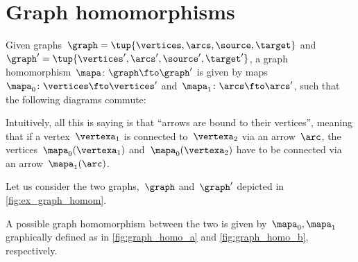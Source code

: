 
\section{Graph homomorphisms}
\begin{definition}
    \label{def:graph_homom}
    Given graphs~$\graph=\tup{\vertices,\arcs,\source,\target}$ and~$\graph'=\tup{\vertices',\arcs',\source',\target'}$, a graph homomorphism~$\mapa \colon \graph \fto \graph'$ is given by maps~$\mapa_0\colon \vertices \fto \vertices'$ and~$\mapa_1\colon \arcs \fto \arcs'$, such that the following diagrams commute:
    \begin{center}
    \end{center}
\end{definition}
\begin{remark}
    Intuitively, all this is saying is that ``arrows are bound to their vertices'', meaning that if a vertex~$\vertexa_1$ is connected to~$\vertexa_2$ via an arrow~$\arc$, the vertices~$\mapa_0(\vertexa_1)$ and~$\mapa_0(\vertexa_2)$ have to be connected via an arrow~$\mapa_1(\arc)$.
\end{remark}

\begin{example}
    \label{exa:homomorphism_graph_positive}
    Let us consider the two graphs,~$\graph$ and~$\graph'$ depicted in \cref{fig:ex_graph_homom}.
    \begin{figure*}[h]
        \centering
        \caption{Example of graphs for graph homomorphism.}
        \label{fig:ex_graph_homom}
    \end{figure*}

    A possible graph homomorphism between the two is given by~$\mapa_0,\mapa_1$ graphically defined as
    in \cref{fig:graph_homo_a} and \cref{fig:graph_homo_b}, respectively.
    \begin{marginfigure}
        \begin{center}
        \end{center}
        \caption{\label{fig:graph_homo_a}}
    \end{marginfigure}

    \begin{marginfigure}
        \begin{center}
        \end{center}
        \caption{\label{fig:graph_homo_b}}
    \end{marginfigure}
\end{example}

